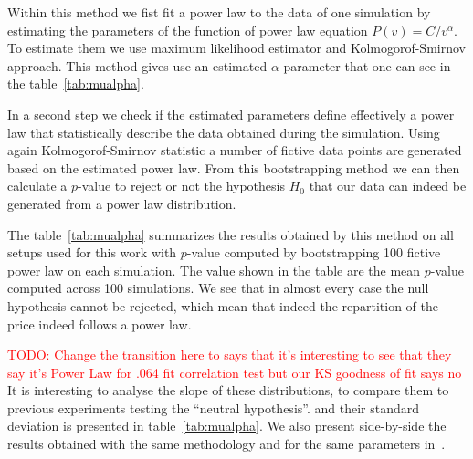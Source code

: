 \documentclass{wscpaperproc}
\newcommand{\memo}[2]{\textcolor{#1}{#2}}
\newcommand{\todo}[1]{\memo{red}{TODO: #1\\}}
\begin{document}
Within this method we fist fit a power law to the data of one simulation by estimating the parameters of the function of power law equation $P(v)=C/v^\alpha $.
To estimate them we use maximum likelihood estimator and Kolmogorof-Smirnov approach. This method gives use an estimated $\alpha$ parameter that one can see in the table~\ref{tab:mualpha}.

In a second step we check if the estimated parameters define effectively a power law that statistically describe the data obtained during the simulation. Using again Kolmogorof-Smirnov statistic a number of fictive data points are generated based on the estimated power law. From this bootstrapping method we can then calculate a $p$-value to reject or not the hypothesis $H_0$ that our data can indeed be generated from a power law distribution. 

The table~\ref{tab:mualpha} summarizes the results obtained by this method on all setups used for this work with $p$-value computed by bootstrapping 100 fictive power law on each simulation. The value shown in the table are the mean $p$-value computed across 100 simulations. We see that in almost every case the null hypothesis cannot be rejected, which mean that indeed the repartition of the price indeed follows a power law.



\todo{Change the transition here to says that it's interesting to see that they say it's Power Law for .064 fit correlation test but our KS goodness of fit says no}
It is interesting to analyse the slope of these distributions, to compare them to previous experiments testing the ``neutral hypothesis''.  and their standard deviation is presented in table~\ref{tab:mualpha}. We also present side-by-side the results obtained with the same methodology and for the same parameters in~\cite{bentley_random_2004}.
\end{document}
